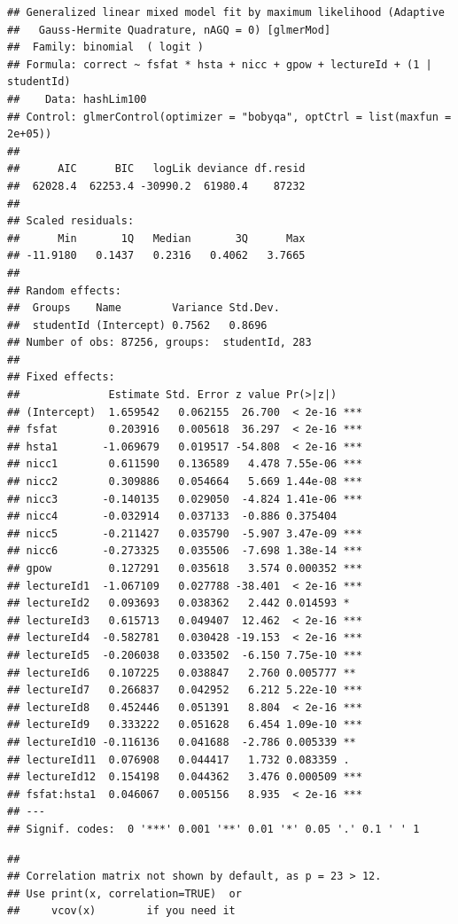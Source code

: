 \documentclass[
]{article}
\begin{document}
\begin{verbatim}
## Generalized linear mixed model fit by maximum likelihood (Adaptive
##   Gauss-Hermite Quadrature, nAGQ = 0) [glmerMod]
##  Family: binomial  ( logit )
## Formula: correct ~ fsfat * hsta + nicc + gpow + lectureId + (1 | studentId)
##    Data: hashLim100
## Control: glmerControl(optimizer = "bobyqa", optCtrl = list(maxfun = 2e+05))
## 
##      AIC      BIC   logLik deviance df.resid 
##  62028.4  62253.4 -30990.2  61980.4    87232 
## 
## Scaled residuals: 
##      Min       1Q   Median       3Q      Max 
## -11.9180   0.1437   0.2316   0.4062   3.7665 
## 
## Random effects:
##  Groups    Name        Variance Std.Dev.
##  studentId (Intercept) 0.7562   0.8696  
## Number of obs: 87256, groups:  studentId, 283
## 
## Fixed effects:
##              Estimate Std. Error z value Pr(>|z|)    
## (Intercept)  1.659542   0.062155  26.700  < 2e-16 ***
## fsfat        0.203916   0.005618  36.297  < 2e-16 ***
## hsta1       -1.069679   0.019517 -54.808  < 2e-16 ***
## nicc1        0.611590   0.136589   4.478 7.55e-06 ***
## nicc2        0.309886   0.054664   5.669 1.44e-08 ***
## nicc3       -0.140135   0.029050  -4.824 1.41e-06 ***
## nicc4       -0.032914   0.037133  -0.886 0.375404    
## nicc5       -0.211427   0.035790  -5.907 3.47e-09 ***
## nicc6       -0.273325   0.035506  -7.698 1.38e-14 ***
## gpow         0.127291   0.035618   3.574 0.000352 ***
## lectureId1  -1.067109   0.027788 -38.401  < 2e-16 ***
## lectureId2   0.093693   0.038362   2.442 0.014593 *  
## lectureId3   0.615713   0.049407  12.462  < 2e-16 ***
## lectureId4  -0.582781   0.030428 -19.153  < 2e-16 ***
## lectureId5  -0.206038   0.033502  -6.150 7.75e-10 ***
## lectureId6   0.107225   0.038847   2.760 0.005777 ** 
## lectureId7   0.266837   0.042952   6.212 5.22e-10 ***
## lectureId8   0.452446   0.051391   8.804  < 2e-16 ***
## lectureId9   0.333222   0.051628   6.454 1.09e-10 ***
## lectureId10 -0.116136   0.041688  -2.786 0.005339 ** 
## lectureId11  0.076908   0.044417   1.732 0.083359 .  
## lectureId12  0.154198   0.044362   3.476 0.000509 ***
## fsfat:hsta1  0.046067   0.005156   8.935  < 2e-16 ***
## ---
## Signif. codes:  0 '***' 0.001 '**' 0.01 '*' 0.05 '.' 0.1 ' ' 1
\end{verbatim}

\begin{verbatim}
## 
## Correlation matrix not shown by default, as p = 23 > 12.
## Use print(x, correlation=TRUE)  or
##     vcov(x)        if you need it
\end{verbatim}
\end{document}
